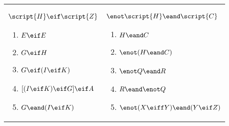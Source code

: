 \begin{exercises}
\begin{longtabu}{p{2.5in}p{2.5in}}
\\ 
\item $ \script{H} \eif \script{Z} $ 
\begin{flushleft} 	
\begin{enumerate}[label=\alph*.]
\item 	$E \eif E$
\item 	$G \eif H$
\item 	$G \eif (I \eif K)$
\item 	$[(I \eif K) \eif G] \eif A$
\item 	$G \eand (I \eif K)$
\end{enumerate}
\end{flushleft}
&
\item $ \enot \script{H} \eand \script{C} $ 
\begin{flushleft} 	
\begin{enumerate}[label=\alph*.]
\item 	$H \eand C$
\item 	$\enot (H \eand C)$
\item 	$\enot Q \eand R$
\item 	$R \eand \enot Q$
\item 	$\enot (X \eiff Y) \eand (Y \eif Z)$
\end{enumerate}
\end{flushleft}

\end{longtabu}
\end{exercises}
